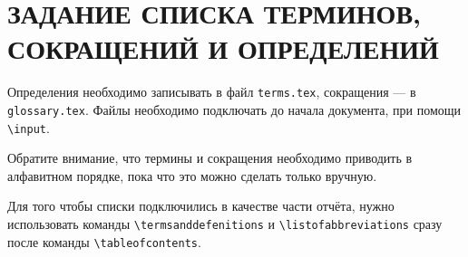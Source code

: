 \section{ЗАДАНИЕ СПИСКА ТЕРМИНОВ, СОКРАЩЕНИЙ И ОПРЕДЕЛЕНИЙ}

Определения необходимо записывать в файл \texttt{terms.tex}, сокращения --- в \texttt{glossary.tex}.
Файлы необходимо подключать до начала документа, при помощи \texttt{\textbackslash input}.

Обратите внимание, что термины и сокращения необходимо приводить в алфавитном порядке, пока что это можно сделать только вручную.

Для того чтобы списки подключились в качестве части отчёта, 
нужно использовать команды \texttt{\textbackslash termsanddefenitions} и \texttt{\textbackslash listofabbreviations} 
сразу после команды \texttt{\textbackslash tableofcontents}.
